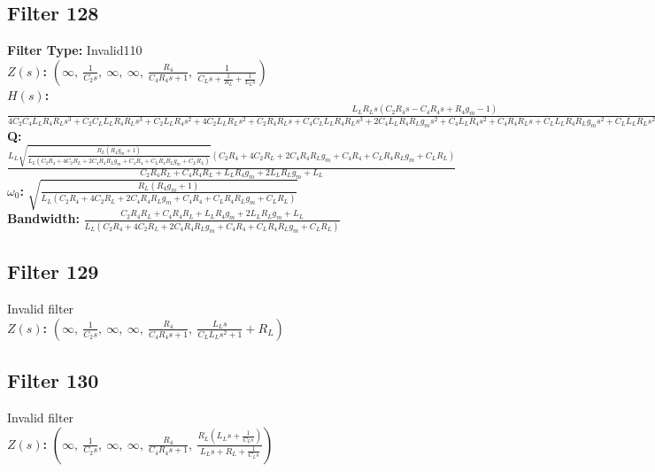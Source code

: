 \documentclass{article}
\begin{document}
\subsection*{Filter 128}
\textbf{Filter Type:} Invalid110 \\ 
\textbf{$Z(s)$:} $\left( \infty, \  \frac{1}{C_{2} s}, \  \infty, \  \infty, \  \frac{R_{4}}{C_{4} R_{4} s + 1}, \  \frac{1}{C_{L} s + \frac{1}{R_{L}} + \frac{1}{L_{L} s}}\right)$ \\ 
\textbf{$H(s)$:} $\frac{L_{L} R_{L} s \left(C_{2} R_{4} s - C_{4} R_{4} s + R_{4} g_{m} - 1\right)}{4 C_{2} C_{4} L_{L} R_{4} R_{L} s^{3} + C_{2} C_{L} L_{L} R_{4} R_{L} s^{3} + C_{2} L_{L} R_{4} s^{2} + 4 C_{2} L_{L} R_{L} s^{2} + C_{2} R_{4} R_{L} s + C_{4} C_{L} L_{L} R_{4} R_{L} s^{3} + 2 C_{4} L_{L} R_{4} R_{L} g_{m} s^{2} + C_{4} L_{L} R_{4} s^{2} + C_{4} R_{4} R_{L} s + C_{L} L_{L} R_{4} R_{L} g_{m} s^{2} + C_{L} L_{L} R_{L} s^{2} + L_{L} R_{4} g_{m} s + 2 L_{L} R_{L} g_{m} s + L_{L} s + R_{4} R_{L} g_{m} + R_{L}}$ \\ 
\textbf{Q:} $\frac{L_{L} \sqrt{\frac{R_{L} \left(R_{4} g_{m} + 1\right)}{L_{L} \left(C_{2} R_{4} + 4 C_{2} R_{L} + 2 C_{4} R_{4} R_{L} g_{m} + C_{4} R_{4} + C_{L} R_{4} R_{L} g_{m} + C_{L} R_{L}\right)}} \left(C_{2} R_{4} + 4 C_{2} R_{L} + 2 C_{4} R_{4} R_{L} g_{m} + C_{4} R_{4} + C_{L} R_{4} R_{L} g_{m} + C_{L} R_{L}\right)}{C_{2} R_{4} R_{L} + C_{4} R_{4} R_{L} + L_{L} R_{4} g_{m} + 2 L_{L} R_{L} g_{m} + L_{L}}$ \\ 
\textbf{$\omega_0$:} $\sqrt{\frac{R_{L} \left(R_{4} g_{m} + 1\right)}{L_{L} \left(C_{2} R_{4} + 4 C_{2} R_{L} + 2 C_{4} R_{4} R_{L} g_{m} + C_{4} R_{4} + C_{L} R_{4} R_{L} g_{m} + C_{L} R_{L}\right)}}$ \\ 
\textbf{Bandwidth:} $\frac{C_{2} R_{4} R_{L} + C_{4} R_{4} R_{L} + L_{L} R_{4} g_{m} + 2 L_{L} R_{L} g_{m} + L_{L}}{L_{L} \left(C_{2} R_{4} + 4 C_{2} R_{L} + 2 C_{4} R_{4} R_{L} g_{m} + C_{4} R_{4} + C_{L} R_{4} R_{L} g_{m} + C_{L} R_{L}\right)}$ \\ 
\subsection*{Filter 129}
Invalid filter \\ 
\textbf{$Z(s)$:} $\left( \infty, \  \frac{1}{C_{2} s}, \  \infty, \  \infty, \  \frac{R_{4}}{C_{4} R_{4} s + 1}, \  \frac{L_{L} s}{C_{L} L_{L} s^{2} + 1} + R_{L}\right)$ \\ 
\subsection*{Filter 130}
Invalid filter \\ 
\textbf{$Z(s)$:} $\left( \infty, \  \frac{1}{C_{2} s}, \  \infty, \  \infty, \  \frac{R_{4}}{C_{4} R_{4} s + 1}, \  \frac{R_{L} \left(L_{L} s + \frac{1}{C_{L} s}\right)}{L_{L} s + R_{L} + \frac{1}{C_{L} s}}\right)$ \\ 
\end{document}
